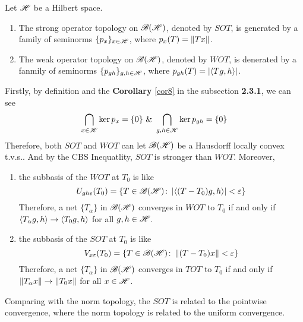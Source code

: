 \documentclass[a4paper,11pt]{report}
\begin{document}
\begin{defn}
	Let $\mathscr{H}$ be a Hilbert space. 
	\begin{enumerate}[label=\arabic*)]
		\item The strong operator topology on $\mathscr{B(H)}$, denoted by $SOT$, is generated by a family of seminorms $\{p_x\}_{x \in \mathscr{H}}$, where $p_x(T) = \left\lVert Tx\right\lVert$.
		\item The weak operator topology on $\mathscr{B(H)}$, denoted by $WOT$, is denerated by a fanmily of seminorms $\{p_{gh}\}_{g,h \in \mathscr{H}}$, where $p_{gh}(T) = \left\lvert\langle Tg,h \rangle\right\lvert$.
	\end{enumerate}
\end{defn}
\begin{rem}
	Firstly, by definition and the \textbf{Corollary} \ref{cor8} in the subsection \textbf{2.3.1}, we can see 
	\begin{equation*}
		\bigcap_{x \in \mathscr{H}} \ker{p_x}=\{0\} ~\&~ \bigcap_{g,h \in \mathscr{H}} \ker{p_{gh}}=\{0\}
	\end{equation*}
	Therefore, both $SOT$ and $WOT$ can let $\mathscr{B(H)}$ be a Hausdorff locally convex t.v.s.. And by the CBS Inequatlity, $SOT$ is stronger than $WOT$. Moreover,
	\begin{enumerate}[label=\arabic*)]
		\item the subbasis of the $WOT$ at $T_0$ is like 
			\begin{equation*}
				U_{gh\varepsilon}(T_0) = \{T \in \mathscr{B(H)} \colon \left\lvert\langle (T-T_0)g,h \rangle\right\lvert < \varepsilon\}
			\end{equation*}
		Therefore, a net $\{T_\alpha\}$ in $\mathscr{B(H)}$ converges in $WOT$ to $T_0$ if and only if $\langle T_{\alpha}g,h \rangle \rightarrow \langle T_0g,h \rangle $ for all $g,h \in \mathscr{H}$.
		\item the subbasis of the $SOT$ at $T_0$ is like 
			\begin{equation*}
				V_{x\varepsilon}(T_0) = \{T \in \mathscr{B(H)} \colon \left\lVert(T-T_0)x\right\lVert < \varepsilon\}
			\end{equation*}
		Therefore, a net $\{T_\alpha\}$ in $\mathscr{B(H)}$ converges in $TOT$ to $T_0$ if and only if $\left\lVert T_{\alpha}x\right\lVert \rightarrow \left\lVert T_0x\right\lVert$ for all $x \in \mathscr{H}$.
	\end{enumerate}
	Comparing with the norm topology, the $SOT$ is related to the pointwise convergence, where the norm topology is related to the uniform convergence.
\end{rem}
\end{document}
